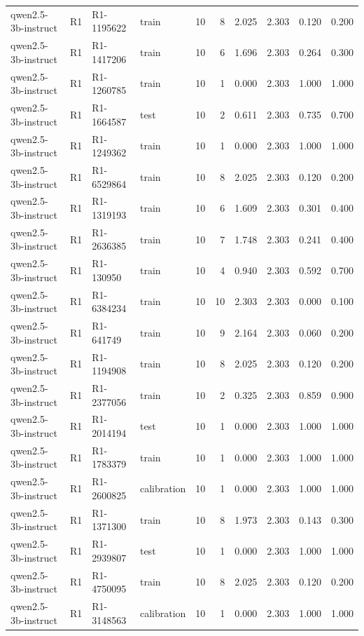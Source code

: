 \begin{table}
\begin{tabular}{llllrrrrrr}
qwen2.5-3b-instruct & R1 & R1-1195622 & train & 10 & 8 & 2.025 & 2.303 & 0.120 & 0.200 \\
qwen2.5-3b-instruct & R1 & R1-1417206 & train & 10 & 6 & 1.696 & 2.303 & 0.264 & 0.300 \\
qwen2.5-3b-instruct & R1 & R1-1260785 & train & 10 & 1 & 0.000 & 2.303 & 1.000 & 1.000 \\
qwen2.5-3b-instruct & R1 & R1-1664587 & test & 10 & 2 & 0.611 & 2.303 & 0.735 & 0.700 \\
qwen2.5-3b-instruct & R1 & R1-1249362 & train & 10 & 1 & 0.000 & 2.303 & 1.000 & 1.000 \\
qwen2.5-3b-instruct & R1 & R1-6529864 & train & 10 & 8 & 2.025 & 2.303 & 0.120 & 0.200 \\
qwen2.5-3b-instruct & R1 & R1-1319193 & train & 10 & 6 & 1.609 & 2.303 & 0.301 & 0.400 \\
qwen2.5-3b-instruct & R1 & R1-2636385 & train & 10 & 7 & 1.748 & 2.303 & 0.241 & 0.400 \\
qwen2.5-3b-instruct & R1 & R1-130950 & train & 10 & 4 & 0.940 & 2.303 & 0.592 & 0.700 \\
qwen2.5-3b-instruct & R1 & R1-6384234 & train & 10 & 10 & 2.303 & 2.303 & 0.000 & 0.100 \\
qwen2.5-3b-instruct & R1 & R1-641749 & train & 10 & 9 & 2.164 & 2.303 & 0.060 & 0.200 \\
qwen2.5-3b-instruct & R1 & R1-1194908 & train & 10 & 8 & 2.025 & 2.303 & 0.120 & 0.200 \\
qwen2.5-3b-instruct & R1 & R1-2377056 & train & 10 & 2 & 0.325 & 2.303 & 0.859 & 0.900 \\
qwen2.5-3b-instruct & R1 & R1-2014194 & test & 10 & 1 & 0.000 & 2.303 & 1.000 & 1.000 \\
qwen2.5-3b-instruct & R1 & R1-1783379 & train & 10 & 1 & 0.000 & 2.303 & 1.000 & 1.000 \\
qwen2.5-3b-instruct & R1 & R1-2600825 & calibration & 10 & 1 & 0.000 & 2.303 & 1.000 & 1.000 \\
qwen2.5-3b-instruct & R1 & R1-1371300 & train & 10 & 8 & 1.973 & 2.303 & 0.143 & 0.300 \\
qwen2.5-3b-instruct & R1 & R1-2939807 & test & 10 & 1 & 0.000 & 2.303 & 1.000 & 1.000 \\
qwen2.5-3b-instruct & R1 & R1-4750095 & train & 10 & 8 & 2.025 & 2.303 & 0.120 & 0.200 \\
qwen2.5-3b-instruct & R1 & R1-3148563 & calibration & 10 & 1 & 0.000 & 2.303 & 1.000 & 1.000 \\

\end{tabular}
\end{table}

